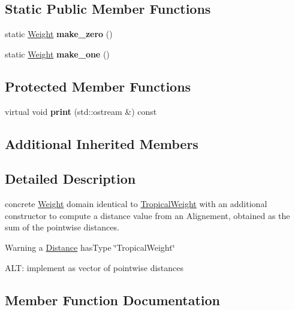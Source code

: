 \subsection*{Static Public Member Functions}
\begin{DoxyCompactItemize}
\item 
\mbox{\label{classDistance_aaee519eac86eeda240033a255a50d806}} 
static \mbox{\hyperlink{classWeight}{Weight}} {\bfseries make\+\_\+zero} ()
\item 
\mbox{\label{classDistance_afbe094e5ca408d7168f18a78b809a193}} 
static \mbox{\hyperlink{classWeight}{Weight}} {\bfseries make\+\_\+one} ()
\end{DoxyCompactItemize}
\subsection*{Protected Member Functions}
\begin{DoxyCompactItemize}
\item 
virtual void {\bfseries print} (std\+::ostream \&) const
\end{DoxyCompactItemize}
\subsection*{Additional Inherited Members}


\subsection{Detailed Description}
concrete \mbox{\hyperlink{classWeight}{Weight}} domain identical to \mbox{\hyperlink{classTropicalWeight}{Tropical\+Weight}} with an additional constructor to compute a distance value from an Alignement, obtained as the sum of the pointwise distances. 

\begin{DoxyWarning}{Warning}
a \mbox{\hyperlink{classDistance}{Distance}} has\+Type \char`\"{}\+Tropical\+Weight\char`\"{}
\end{DoxyWarning}
A\+LT\+: implement as vector of pointwise distances 

\subsection{Member Function Documentation}
\mbox{\label{classDistance_a1fe45f762afff378c46f81d6199a14ab}} 
